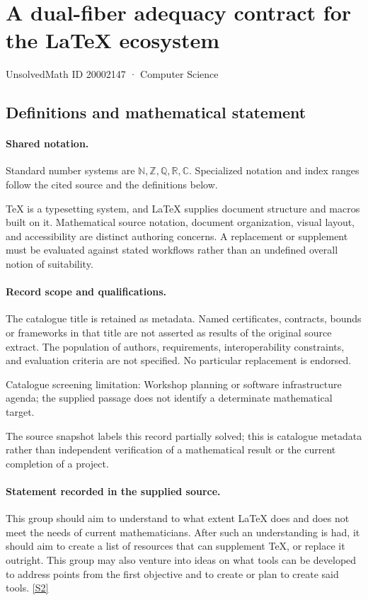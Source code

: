 \documentclass[11pt]{article}
\newcommand{\sref}[2]{\hyperlink{source:#1:#2}{[S#2]}}
\begin{document}
\setcounter{section}{20002146}
\section{A dual-fiber adequacy contract for the LaTeX ecosystem}\label{20002147}
{\small\sffamily UnsolvedMath ID 20002147 · Computer Science}
\subsection{Definitions and mathematical statement}

\paragraph{Shared notation.}Standard number systems are $\mathbb N,\mathbb Z,\mathbb Q,\mathbb R,\mathbb C$. Specialized notation and index ranges follow the cited source and the definitions below.


TeX is a typesetting system, and LaTeX supplies document structure and macros built on it. Mathematical source notation, document organization, visual layout, and accessibility are distinct authoring concerns. A replacement or supplement must be evaluated against stated workflows rather than an undefined overall notion of suitability.
\paragraph{Record scope and qualifications.}
The catalogue title is retained as metadata. Named certificates, contracts, bounds or frameworks in that title are not asserted as results of the original source extract.
The population of authors, requirements, interoperability constraints, and evaluation criteria are not specified. No particular replacement is endorsed.

Catalogue screening limitation: Workshop planning or software infrastructure agenda; the supplied passage does not identify a determinate mathematical target.

The source snapshot labels this record partially solved; this is catalogue metadata rather than independent verification of a mathematical result or the current completion of a project.
\paragraph{Statement recorded in the supplied source.}
This group should aim to understand to what extent LaTeX does and does not meet the needs of current mathematicians. After such an understanding is had, it should aim to create a list of resources that can supplement TeX, or replace it outright. This group may also venture into ideas on what tools can be developed to address points from the first objective and to create or plan to create said tools. \sref{20002147}{2}
\end{document}
